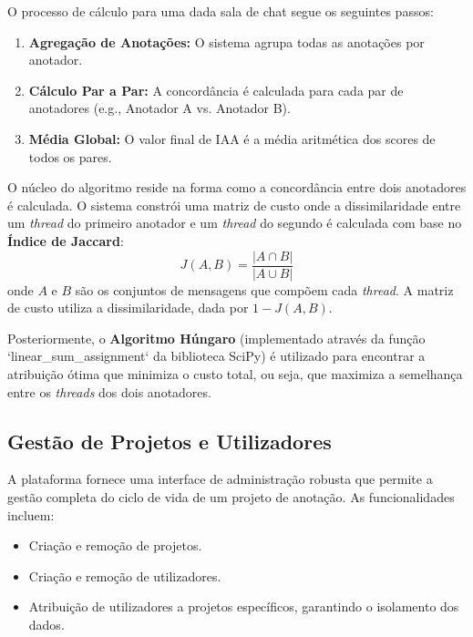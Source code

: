 O processo de cálculo para uma dada sala de chat segue os seguintes passos:
\begin{enumerate}
    \item \textbf{Agregação de Anotações:} O sistema agrupa todas as anotações por anotador.
    \item \textbf{Cálculo Par a Par:} A concordância é calculada para cada par de anotadores (e.g., Anotador A vs. Anotador B).
    \item \textbf{Média Global:} O valor final de IAA é a média aritmética dos scores de todos os pares.
\end{enumerate}

O núcleo do algoritmo reside na forma como a concordância entre dois anotadores é calculada. O sistema constrói uma matriz de custo onde a dissimilaridade entre um \textit{thread} do primeiro anotador e um \textit{thread} do segundo é calculada com base no \textbf{Índice de Jaccard}:
\[ J(A, B) = \frac{|A \cap B|}{|A \cup B|} \]
onde \(A\) e \(B\) são os conjuntos de mensagens que compõem cada \textit{thread}. A matriz de custo utiliza a dissimilaridade, dada por \(1 - J(A, B)\).

Posteriormente, o \textbf{Algoritmo Húngaro} (implementado através da função `linear_sum_assignment` da biblioteca SciPy) é utilizado para encontrar a atribuição ótima que minimiza o custo total, ou seja, que maximiza a semelhança entre os \textit{threads} dos dois anotadores.


\subsection{Gestão de Projetos e Utilizadores}

A plataforma fornece uma interface de administração robusta que permite a gestão completa do ciclo de vida de um projeto de anotação. As funcionalidades incluem:
\begin{itemize}
    \item Criação e remoção de projetos.
    \item Criação e remoção de utilizadores.
    \item Atribuição de utilizadores a projetos específicos, garantindo o isolamento dos dados.
\end{itemize}

